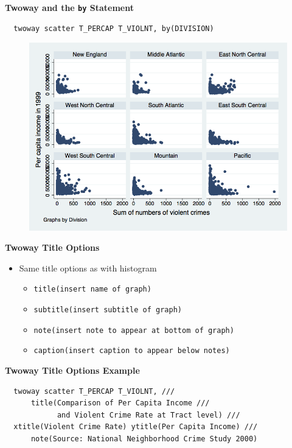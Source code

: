\documentclass[]{book}
\providecommand{\tightlist}{%
  \setlength{\itemsep}{0pt}\setlength{\parskip}{0pt}}
\begin{document}
\textbf{Twoway and the \texttt{by} Statement}

\begin{verbatim}
  twoway scatter T_PERCAP T_VIOLNT, by(DIVISION)
\end{verbatim}

\begin{figure}
\centering
\includegraphics{Stata/StataModGraph/images/twowayby.png}
\caption{}
\end{figure}

\textbf{Twoway Title Options}

\begin{itemize}
\tightlist
\item
  Same title options as with histogram

  \begin{itemize}
  \tightlist
  \item
    \texttt{title(insert\ name\ of\ graph)}
  \item
    \texttt{subtitle(insert\ subtitle\ of\ graph)}
  \item
    \texttt{note(insert\ note\ to\ appear\ at\ bottom\ of\ graph)}
  \item
    \texttt{caption(insert\ caption\ to\ appear\ below\ notes)}
  \end{itemize}
\end{itemize}

\textbf{Twoway Title Options Example}

\begin{verbatim}
  twoway scatter T_PERCAP T_VIOLNT, ///
      title(Comparison of Per Capita Income ///
            and Violent Crime Rate at Tract level) ///
  xtitle(Violent Crime Rate) ytitle(Per Capita Income) ///
      note(Source: National Neighborhood Crime Study 2000) 
\end{verbatim}
\end{document}

